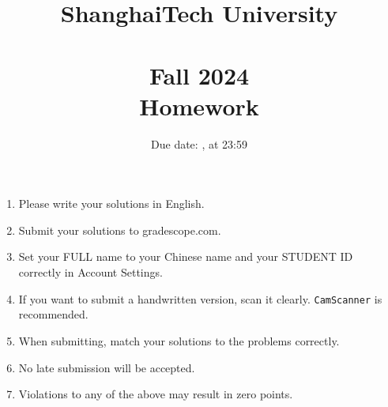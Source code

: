 \documentclass[11pt, addpoints, answers]{exam}
\title{
    \vspace{25pt}
    \LARGE ShanghaiTech University \\
    \bigskip
    \textbf{\CourseName} \\
    \textbf{Fall 2024}   \\
    \bigskip
    Homework \HomeworkNO
}
\author{}
\date{Due date: \DueDate, at 23:59}
\newcommand{\ttt}{\texttt}
\begin{document}
\maketitle

\begin{enumerate}
	\item Please write your solutions in English.
	\item Submit your solutions to gradescope.com.
	\item Set your FULL name to your Chinese name and your STUDENT ID correctly in Account Settings.
	\item If you want to submit a handwritten version, scan it clearly. \ttt{CamScanner} is recommended.
	\item When submitting, match your solutions to the problems correctly.
	\item No late submission will be accepted.
	\item Violations to any of the above may result in zero points.
\end{enumerate}

\begin{questions}
	
    \newpage
    
    \newpage
    
\end{questions}
\end{document}
